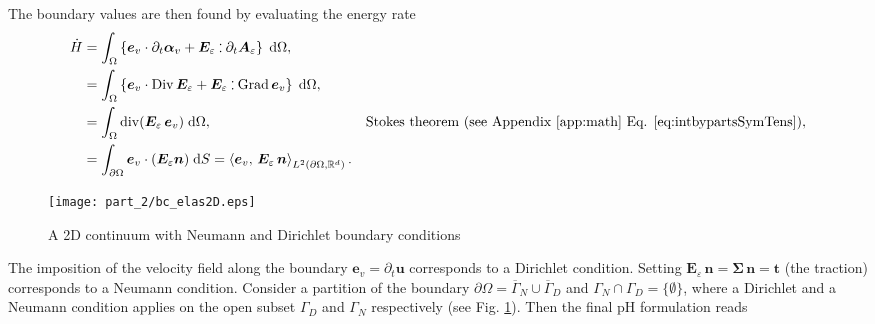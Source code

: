 The boundary values are then found by evaluating the energy rate
\begin{equation}\label{eq:enrateElas}
\begin{aligned}
\dot{H} &= \int_{\Omega} \left\{ \bm{e}_v \cdot \partial_t \bm\alpha_v + \bm{E}_\varepsilon \cddot \partial_t \bm{A}_\varepsilon \right\} \d\Omega, \\
&= \int_{\Omega} \left\{\bm{e}_v \cdot \Div \bm{E}_\varepsilon + \bm{E}_\varepsilon \cddot \Grad \bm{e}_v \right\}\d\Omega,\\
&= \int_{\Omega} \div(\bm{E}_\varepsilon \, \bm{e}_v) \d\Omega, \qquad &\text{Stokes theorem (see  Appendix \ref{app:math} Eq. \eqref{eq:intbypartsSymTens}}), \\
&= \int_{\partial \Omega} \bm{e}_v \cdot (\bm{E}_\varepsilon\bm{n}) \d{S} = \inner[L^2(\partial\Omega, \bbR^d)]{\bm{e}_v}{\bm{E}_\varepsilon \, \bm{n}}.
\end{aligned}
\end{equation}

\begin{figure}
\centering
\texttt{[image: part\_2/bc\_elas2D.eps]}
\caption{A 2D continuum with Neumann and Dirichlet boundary conditions}
\label{fig:bc_elas2D}
\end{figure}
The imposition of the velocity field along the boundary $\bm{e}_v = \partial_t \bm{u}$ corresponds to a Dirichlet condition. Setting $\bm{E}_\varepsilon \, \bm{n} = \bm{\Sigma} \,  \bm{n} = \bm{t}$ (the traction) corresponds to a Neumann condition. Consider a partition of the boundary $\partial\Omega = \overline{\Gamma}_N \cup \overline{\Gamma}_D$ and $\Gamma_N \cap \Gamma_D =  \{\emptyset\}$, where a Dirichlet and a Neumann condition applies on the open subset $\Gamma_D$ and $\Gamma_N$ respectively (see Fig. \ref{fig:bc_elas2D}). Then the final pH formulation reads

